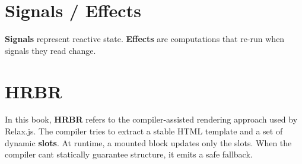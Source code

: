 \section{Signals / Effects}
\textbf{Signals} represent reactive state.
\textbf{Effects} are computations that re-run when signals they read change.

\section{HRBR}
In this book, \textbf{HRBR} refers to the compiler-assisted rendering approach used by Relax.js.
The compiler tries to extract a stable HTML template and a set of dynamic \textbf{slots}.
At runtime, a mounted block updates only the slots.
When the compiler can\textquotesingle t statically guarantee structure, it emits a safe fallback.
